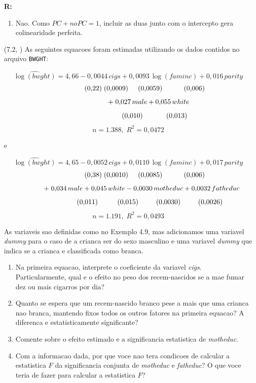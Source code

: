 \documentclass[12pt,letterpaper, onecolumn]{exam}
\renewenvironment{solution}
{\par\noindent\textbf{R:}\enspace\color{blue}}
{\par\color{black}}
\begin{document}
\begin{questions}
\begin{solution}
\begin{enumerate}[label=(\roman*)]
    \item Nao. Como \(PC + noPC = 1\), incluir as duas junto com o intercepto gera colinearidade perfeita.
\end{enumerate}
\end{solution}

\vspace{0.7cm}

\question (7.2, \citep{wooldridge2016}) As seguintes equacoes foram estimadas utilizando os dados contidos no arquivo \texttt{BWGHT}:

\[
\widehat{\log(bwght)} = 4{,}66 - 0{,}0044\,cigs + 0{,}0093\,\log(faminc) + 0{,}016\,parity
\]
\[
\hspace{1.7cm} (0{,}22)\;(0{,}0009)\hspace{0.5cm}(0{,}0059)\hspace{1.1cm}(0{,}006)
\]
\[
\hspace{2.1cm} +\; 0{,}027\,male + 0{,}055\,white
\]
\[
\hspace{2.7cm} (0{,}010)\hspace{1.2cm}(0{,}013)
\]
\[
n = 1{.}388,\; R^2 = 0{,}0472
\]

e

\[
\widehat{\log(bwght)} = 4{,}65 - 0{,}0052\,cigs + 0{,}0110\,\log(faminc) + 0{,}017\,parity
\]
\[
\hspace{1.7cm} (0{,}38)\;(0{,}0010)\hspace{0.5cm}(0{,}0085)\hspace{1.1cm}(0{,}006)
\]
\[
\hspace{1.4cm} +\; 0{,}034\,male + 0{,}045\,white - 0{,}0030\,motheduc + 0{,}0032\,fatheduc
\]
\[
\hspace{2.2cm} (0{,}011)\hspace{1.0cm}(0{,}015)\hspace{0.9cm}(0{,}0030)\hspace{0.9cm}(0{,}0026)
\]
\[
n = 1{.}191,\; R^2 = 0{,}0493
\]

As variaveis sao definidas como no Exemplo 4.9, mas adicionamos uma variavel \textit{dummy} para o caso de a crianca ser do sexo masculino e uma variavel \textit{dummy} que indica se a crianca e classificada como branca.
\begin{enumerate}[label=(\roman*)]
    \item Na primeira equacao, interprete o coeficiente da variavel \textit{cigs}. Particularmente, qual e o efeito no peso dos recem-nascidos se a mae fumar dez ou mais cigarros por dia?
    \item Quanto se espera que um recem-nascido branco pese a mais que uma crianca nao branca, mantendo fixos todos os outros fatores na primeira equacao? A diferenca e estatisticamente significante?
    \item Comente sobre o efeito estimado e a significancia estatistica de \textit{motheduc}.
    \item Com a informacao dada, por que voce nao tera condicoes de calcular a estatistica \(F\) da significancia conjunta de \textit{motheduc} e \textit{fatheduc}? O que voce teria de fazer para calcular a estatistica \(F\)?
\end{enumerate}


\end{questions}
\end{document}

